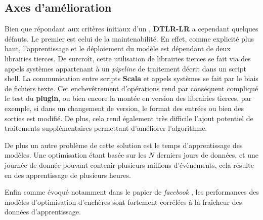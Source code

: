     \subsection{Axes d'amélioration}
        Bien que répondant aux critères initiaux d'un \bo, \textbf{DTLR-LR} a cependant quelques défauts. Le premier est celui de la maintenabilité. En effet, comme explicité plus haut, l'apprentissage et le déploiement du modèle est dépendant de deux librairies tierces. De surcroît, cette utilisation de librairies tierces se fait via des appels systèmes appartenant à un \emph{pipeline} de traitement décrit dans un script shell. La communication entre scripts \textbf{Scala} et appels systèmes se fait par le biais de fichiers texte. Cet enchevêtrement d'opérations rend par conséquent compliqué le test du \textbf{plugin}, ou bien encore la montée en version des librairies tierces, par exemple, si dans un changement de version, le format des entrées ou bien des sorties est modifié. De plus, cela rend également très difficile l'ajout potentiel de traitements supplémentaires permettant d'améliorer l'algorithme. \par De plus un autre problème de cette solution est le temps d'apprentissage des modèles. Une optimisation étant basée sur les $N$ derniers jours de données, et une journée de donnée pouvant contenir plusieurs millions d'évènements, cela résulte en des apprentissage de plusieurs heures. \par
        Enfin comme évoqué notamment dans le papier de \emph{facebook} \cite{yi2013predictive}, les performances des modèles d'optimisation d'enchères sont fortement corrélées à la fraîcheur des données d'apprentissage. \par 
